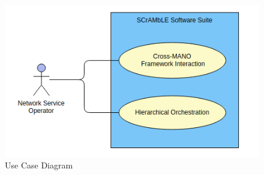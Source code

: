 \begin{figure} [h]
	\centering
	\includegraphics[width=1.0\linewidth]{figures/use-case}
	\caption{Use Case Diagram}
	\label{fig:use-case}
\end{figure}





